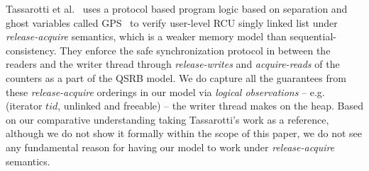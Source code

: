  Tassarotti et al.~\cite{verrcu} uses a protocol based program logic based on separation and ghost variables called \textsf{GPS}~\cite{Turon:2014:GNW:2660193.2660243} to verify user-level \textsf{RCU} singly linked list under \emph{release-acquire} semantics, which is a weaker memory model than sequential-consistency. They enforce the safe synchronization protocol in between the readers and the writer thread through \textit{release-writes} and \textit{acquire-reads} of the counters as a part of the QSRB model. We do capture all the guarantees from these \textit{release-acquire} orderings in our model via \textit{logical observations} -- e.g. (\textsf{iterator} $tid$, \textsf{unlinked} and \textsf{freeable}) -- the writer thread makes on the heap. Based on our comparative understanding taking Tassarotti's work as a reference, although we do not show it formally within the scope of this paper, we do not see any fundamental reason for having our model to work under \textit{release-acquire} semantics. 

